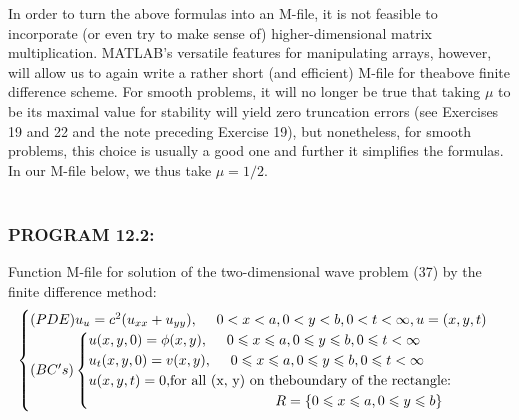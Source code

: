 \documentclass[../main.tex]{subfiles}
\begin{document}
In order to turn the above formulas into an M-file, it is not feasible to incorporate (or even try to make sense of) higher-dimensional matrix multiplication. MATLAB's versatile features for manipulating arrays, however, will allow us to again write a rather short (and efficient) M-file for theabove finite difference scheme. For smooth problems, it will no longer be true that taking $\mu$ to be its maximal value for stability will yield zero truncation errors (see Exercises 19 and 22 and the note preceding Exercise 19), but nonetheless, for smooth problems, this choice is usually a good one and further it simplifies the formulas. In our M-file below, we thus take $\mu = 1 / 2$. 
\\
\\
\subsubsection{PROGRAM 12.2:} Function M-file for solution of the two-dimensional wave problem (37) 
by the finite difference method:
\begin{equation}\label{eqa41}
	\begin{cases} 
	(PDE) u_u=c^2 (u_{xx}+u_{yy}),~~~~0<x<a, 0<y<b,0<t<\infty,u=(x,y,t)\\
(BC's)
		\begin{cases}
		u(x,y,0)=\phi(x,y), ~~~~ 0\leqslant x \leqslant a,0\leqslant y \leqslant b, 0 \leqslant t< \infty \\
		u_t(x,y,0)=v(x,y), ~~~~ 0\leqslant x \leqslant a,0\leqslant y \leqslant b, 0 \leqslant t< \infty \\
		 u(x, y, t) = 0, $for all (x, y) on theboundary of the rectangle:$\\
		 ~~~~~~~~~~~~~~~~~~~~~~~~~~~~~~~~~~~~~~~~ R= \lbrace 0\leqslant x\leqslant a, 0\leqslant y \leqslant b \rbrace
		\end{cases} 
	\end{cases}
\end{equation}
\end{document}
